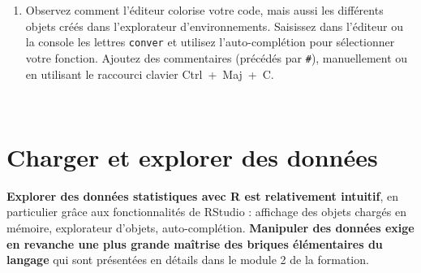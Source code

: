 \documentclass[12pt,twosided, notitlepage]{book}
\newenvironment{Shaded}{}{}
\newcommand{\KeywordTok}[1]{\textcolor[rgb]{0.00,0.00,1.00}{{#1}}}
\newcommand{\DecValTok}[1]{{#1}}
\newcommand{\StringTok}[1]{\textcolor[rgb]{0.00,0.50,0.50}{{#1}}}
\newcommand{\CommentTok}[1]{\textcolor[rgb]{0.00,0.50,0.00}{{#1}}}
\newcommand{\NormalTok}[1]{{#1}}
\newif \ifsol
\renewenvironment{Shaded}{\begin{snugshade}}{\end{snugshade}}
\begin{document}
\begin{enumerate}
  \ifsol 

  \begin{center} \rule{0.5\linewidth}{\linethickness}\end{center}

\begin{Shaded}
\begin{Highlighting}[]
\CommentTok{# On reprend les éléments du cas pratique 1.1 pour rendre la fonction}
\CommentTok{# véritablement opérante :}
\NormalTok{conversion <-}\StringTok{ }\NormalTok{function(duree)\{}
  \NormalTok{min <-}\StringTok{ }\NormalTok{duree %
  \NormalTok{sec <-}\StringTok{ }\NormalTok{duree %
  \NormalTok{resultat <-}\StringTok{ }\KeywordTok{paste}\NormalTok{(}
    \StringTok{"Le traitement a duré"}\NormalTok{, min, }\StringTok{"minutes et"}\NormalTok{, sec, }\StringTok{"secondes."}
  \NormalTok{)}
  \KeywordTok{return}\NormalTok{(resultat)}
\NormalTok{\}}
\KeywordTok{conversion}\NormalTok{(}\DecValTok{2456}\NormalTok{)}
  \NormalTok{## [1] "Le traitement a duré 40 minutes et 56 secondes."}
\KeywordTok{conversion}\NormalTok{(}\DecValTok{7564}\NormalTok{)}
  \NormalTok{## [1] "Le traitement a duré 126 minutes et 4 secondes."}
\end{Highlighting}
\end{Shaded}

  \begin{center} \rule{0.5\linewidth}{\linethickness}\end{center}

  \bigskip  \fi 
\item
  Observez comment l'éditeur colorise votre code, mais aussi les
  différents objets créés dans l'explorateur d'environnements. Saisissez
  dans l'éditeur ou la console les lettres \texttt{conver} et utilisez
  l'auto-complétion pour sélectionner votre fonction. Ajoutez des
  commentaires (précédés par \texttt{\#}), manuellement ou en utilisant
  le raccourci clavier Ctrl~+~Maj~+~C.
\end{enumerate}

~

\section{Charger et explorer des
données}\label{charger-et-explorer-des-donnees}

\textbf{Explorer des données statistiques avec R est relativement
intuitif}, en particulier grâce aux fonctionnalités de RStudio :
affichage des objets chargés en mémoire, explorateur d'objets,
auto-complétion. \textbf{Manipuler des données exige en revanche une
plus grande maîtrise des briques élémentaires du langage} qui sont
présentées en détails dans le module 2 de la formation.
\end{document}
